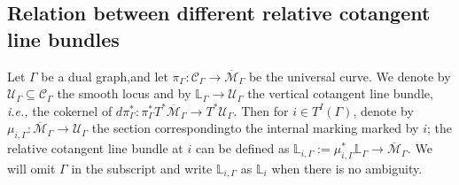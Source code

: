\documentclass[11pt]{amsart}
\theoremstyle{definition}
\theoremstyle{remark}
\newcommand{\<}{\left<}
\renewcommand{\>}{\right>}
\numberwithin{equation}{section}
\def\Mbar{{\overline{\mathcal M}}}
\begin{document}
\subsection{Relation between different relative cotangent line bundles}\label{sec cotangent lines relation}
Let $\Gamma$ be a %
dual graph,and let %
$\pi_{\Gamma}\colon\mathcal C_{\Gamma}\to \Mbar_{\Gamma}$ be the universal curve. We denote by %
$\mathcal U_{\Gamma}\subseteq \mathcal C_{\Gamma}$  the %
smooth locus and %
by $\mathbb L_{\Gamma}\to \mathcal U_{\Gamma}$ the vertical cotangent line bundle, \textit{i.e.,} the cokernel of $d\pi^*_{\Gamma}\colon \pi^*_{\Gamma} T^*\Mbar_{\Gamma}\to T^* \mathcal U_{\Gamma}$. Then for $i\in T^I(\Gamma)$, denote by $\mu_{i,\Gamma}\colon \Mbar_{\Gamma}\to \mathcal U_{\Gamma}$ the %
section correspondingto the %
internal marking marked %
by $i$; the %
relative cotangent line bundle at $i$ can be defined as $\mathbb L_{i,\Gamma}:=\mu_{i,\Gamma}^*\mathbb L_{\Gamma} \to \Mbar_{\Gamma}$. We will omit $\Gamma$ in the subscript and write $\mathbb L_{i,\Gamma}$ as $\mathbb L_{i}$ when there is no ambiguity.
\end{document}
